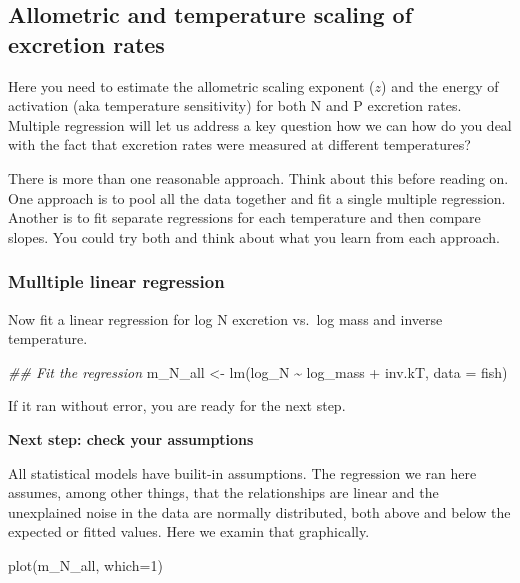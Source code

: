 \documentclass[
  letterpaper,
  DIV=11,
  numbers=noendperiod]{scrreprt}
\newenvironment{Shaded}{\begin{snugshade}}{\end{snugshade}}
\newcommand{\AttributeTok}[1]{\textcolor[rgb]{0.40,0.45,0.13}{#1}}
\newcommand{\DecValTok}[1]{\textcolor[rgb]{0.68,0.00,0.00}{#1}}
\newcommand{\DocumentationTok}[1]{\textcolor[rgb]{0.37,0.37,0.37}{\textit{#1}}}
\newcommand{\FunctionTok}[1]{\textcolor[rgb]{0.28,0.35,0.67}{#1}}
\newcommand{\NormalTok}[1]{\textcolor[rgb]{0.00,0.23,0.31}{#1}}
\newcommand{\OtherTok}[1]{\textcolor[rgb]{0.00,0.23,0.31}{#1}}
\newcommand{\SpecialCharTok}[1]{\textcolor[rgb]{0.37,0.37,0.37}{#1}}
\begin{document}
\subsection{Allometric and temperature scaling of excretion
rates}\label{sec-assign1}

Here you need to estimate the allometric scaling exponent (\(z\)) and
the energy of activation (aka temperature sensitivity) for both N and P
excretion rates. Multiple regression will let us address a key question
how we can how do you deal with the fact that excretion rates were
measured at different temperatures?

There is more than one reasonable approach. Think about this before
reading on. One approach is to pool all the data together and fit a
single multiple regression. Another is to fit separate regressions for
each temperature and then compare slopes. You could try both and think
about what you learn from each approach.

\subsubsection{Mulltiple linear
regression}\label{mulltiple-linear-regression}

Now fit a linear regression for log N excretion vs.~log mass and inverse
temperature.

\begin{Shaded}
\begin{Highlighting}[]
\DocumentationTok{\#\# Fit the regression}
\NormalTok{m\_N\_all }\OtherTok{\textless{}{-}} \FunctionTok{lm}\NormalTok{(log\_N }\SpecialCharTok{\textasciitilde{}}\NormalTok{ log\_mass }\SpecialCharTok{+}\NormalTok{ inv.kT, }\AttributeTok{data =}\NormalTok{ fish)}
\end{Highlighting}
\end{Shaded}

If it ran without error, you are ready for the next step.

\textbf{Next step: check your assumptions}

All statistical models have builit-in assumptions. The regression we ran
here assumes, among other things, that the relationships are linear and
the unexplained noise in the data are normally distributed, both above
and below the expected or fitted values. Here we examin that
graphically.

\begin{Shaded}
\begin{Highlighting}[]
\FunctionTok{plot}\NormalTok{(m\_N\_all, }\AttributeTok{which=}\DecValTok{1}\NormalTok{)}
\end{Highlighting}
\end{Shaded}
\end{document}
